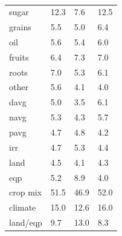 \documentclass[12pt]{article}
\begin{document}
\begin{table}[h!]
{\begin{tabular}{llll}
sugar & 12.3 & 7.6 & 12.5 \\
grains & 5.5 & 5.0 & 6.4 \\
oil & 5.6 & 5.4 & 6.0 \\
fruits & 6.4 & 7.3 & 7.0 \\
roots & 7.0 & 5.3 & 6.1 \\
other & 5.6 & 4.1 & 4.0 \\
davg & 5.0 & 3.5 & 6.1 \\
navg & 5.3 & 4.3 & 5.7 \\
pavg & 4.7 & 4.8 & 4.2 \\
irr & 4.7 & 5.3 & 4.4 \\
land & 4.5 & 4.1 & 4.3 \\
eqp & 5.2 & 8.9 & 4.0 \\
\midrule
crop mix & 51.5 & 46.9 & 52.0 \\
climate & 15.0 & 12.6 & 16.0 \\
land/eqp & 9.7 & 13.0 & 8.3 \\
\bottomrule
\end{tabular}
\caption{ }
\label{t.wy.wt_percentages}
}
\end{table}
\end{document}
